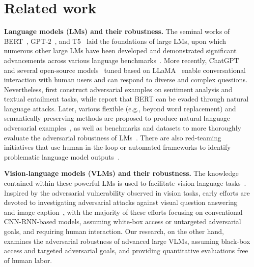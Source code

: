 \section{Related work}
\vspace{-0.15cm}
\textbf{Language models (LMs) and their robustness.} The seminal works of BERT~\citep{devlin2018bert}, GPT-2~\citep{radford2019language}, and T5~\citep{raffel2020exploring} laid the foundations of large LMs, upon which numerous other large LMs have been developed and demonstrated significant advancements across various language benchmarks~\citep{brown2020language,chowdhery2022palm,hoffmann2022training,scao2022bloom,smith2022using,zhang2022opt}. More recently, ChatGPT~\citep{chatgpt,ouyang2022training} and several open-source models~\citep{chiang2023vicuna,taori2023stanford,xu2023baize} tuned based on LLaMA~\citep{touvron2023llama} enable conversational interaction with human users and can respond to diverse and complex questions. Nevertheless, \citet{alzantot2018generating} first construct adversarial examples on sentiment analysis and textual entailment tasks, while \citet{jin2020bert} report that BERT can be evaded through natural language attacks. Later, various flexible (e.g., beyond word replacement) and semantically preserving methods are proposed to produce natural language adversarial examples~\citep{branch2022evaluating,maheshwary2021generating,meng2020geometry,moradi2021evaluating,morris2020reevaluating,ren2020generating,shi2022promptattack,yuan2020transferability,zhang2019fluent,zhuo2023robustness}, as well as benchmarks and datasets to more thoroughly evaluate the adversarial robustness of LMs~\citep{nie2020adversarial,wang2021adversarial,wang2023robustness,wang2021textflint}. There are also red-teaming initiatives that use human-in-the-loop or automated frameworks to identify problematic language model outputs~\citep{ganguli2022red,perez2022red,xu2021bot}.

\textbf{Vision-language models (VLMs) and their robustness.} The knowledge contained within these powerful LMs is used to facilitate vision-language tasks~\citep{driess2023palm,huang2023language,tiong2022plug,wu2023visual,yang2023mm}. Inspired by the adversarial vulnerability observed in vision tasks, early efforts are devoted to investigating adversarial attacks against visual question answering~\citep{bartolo2021improving,cao2022tasa,kaushik2021efficacy,kovatchev2022longhorns,li2021adversarial,sheng2021human,wallace2019trick,xu2018fooling,zhang2022towards} and image caption~\citep{aafaq2021controlled,chen2017attacking,xu2019exact}, with the majority of these efforts focusing on conventional CNN-RNN-based models, assuming white-box access or untargeted adversarial goals, and requiring human interaction. Our research, on the other hand, examines the adversarial robustness of advanced large VLMs, assuming black-box access and targeted adversarial goals, and providing quantitative evaluations free of human labor.

